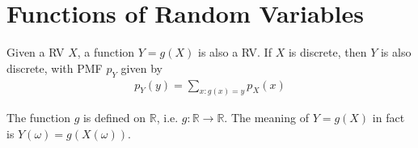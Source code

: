 \section{Functions of Random Variables}
\begin{definition}
    Given a RV $X$, a function $Y = g(X)$ is also a RV. If $X$ is discrete, then $Y$ is also discrete, with PMF $p_{Y}$ given by
    \begin{align}
        p_{Y}(y) = \sum_{x: g(x) = y} p_{X}(x)
    \end{align}
\end{definition}
\begin{remark}
    The function $g$ is defined on $\mathbb{R}$, i.e. $g: \mathbb{R} \rightarrow \mathbb{R}$. The meaning of $Y = g(X)$ in fact is $Y(\omega) = g(X(\omega))$.
\end{remark}

